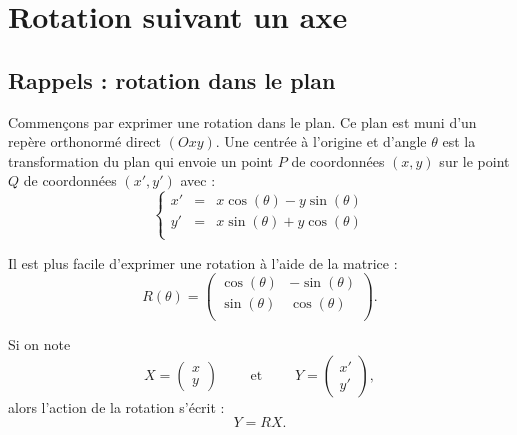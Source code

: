 \documentclass[11pt,class=report,crop=false]{standalone}
\begin{document}








\section{Rotation suivant un axe}

\subsection{Rappels : rotation dans le plan}

Commençons par exprimer une rotation dans le plan. Ce plan est muni d'un repère orthonormé direct $(Oxy)$.
Une  centrée à l'origine et d'angle $\theta$ est la transformation du plan qui envoie un point $P$ de coordonnées $(x,y)$ sur le point $Q$ de coordonnées $(x',y')$ avec :
$$
\left\{
\begin{array}{rcl}
x' &=& x \cos(\theta) - y \sin(\theta) \\
y' &=& x \sin(\theta) + y \cos(\theta) \\
\end{array}
\right.$$



Il est plus facile d'exprimer une rotation à l'aide de la matrice :
$$R(\theta) = 
\begin{pmatrix}
\cos(\theta) & - \sin(\theta) \\
\sin(\theta) & \cos(\theta) \\
\end{pmatrix}.
$$

Si on note 
$$X = \begin{pmatrix} x \\ y \end{pmatrix} \qquad \text{ et } \qquad Y = \begin{pmatrix} x' \\ y' \end{pmatrix},$$
alors l'action de la rotation s'écrit :
$$Y = R X.$$
\end{document}
